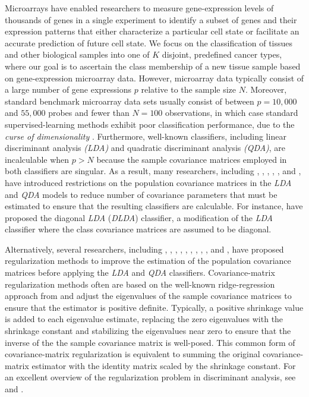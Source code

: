 \documentclass[11pt]{article}
\begin{document}
Microarrays have enabled researchers to measure gene-expression levels of thousands of genes in a single experiment to identify a subset of genes and their expression patterns that either characterize a particular cell state or facilitate an accurate prediction of future cell state.  We focus on the classification of tissues and other biological samples into one of $K$ disjoint, predefined cancer types, where our goal is to ascertain the class membership of a new tissue sample based on gene-expression microarray data. However, microarray data typically consist of a large number of gene expressions $p$ relative to the sample size $N$. Moreover, standard benchmark microarray data sets usually consist of between $p = 10,000$ and $55,000$ probes and fewer than $N = 100$ observations, in which case standard supervised-learning methods exhibit poor classification performance, due to the \emph{curse of dimensionality} \citep{Bellman:1961tn}. Furthermore, well-known classifiers, including linear discriminant analysis \emph{(LDA)} and quadratic discriminant analysis \emph{(QDA)}, are incalculable when $p > N$ because the sample covariance matrices employed in both classifiers are singular. As a result, many researchers, including \cite*{Mai:2012bf}, \cite*{Merchante:2012vk}, \cite{Witten:2011kc}, \cite*{Pang:2009ik}, \cite*{Huang:2010ju}, and \cite*{Clemmensen:2011kr}, have introduced restrictions on the population covariance matrices in the \emph{LDA} and \emph{QDA} models to reduce number of covariance parameters that must be estimated to ensure that the resulting classifiers are calculable.  For instance, \cite{Dudoit:2002ev} have proposed the diagonal \emph{LDA} (\emph{DLDA}) classifier, a modification of the \emph{LDA} classifier where the class covariance matrices are assumed to be diagonal.

Alternatively, several researchers, including \cite*{Zhang:2010va}, \cite{Ye:2009gd}, \cite{Ji:2008wp}, \cite*{Guo:2007te}, \cite{Srivastava:2007ud}, \cite{Ye:2006vx}, \cite*{Thomaz:2006ef}, \cite{Ye:2005uu}, \cite{Mkhadri:1995jp}, and \cite{Peck:1982tt}, have proposed regularization methods to improve the estimation of the population covariance matrices before applying the \emph{LDA} and \emph{QDA} classifiers. Covariance-matrix regularization methods often are based on the well-known ridge-regression approach from \cite{Hoerl:1970cd} and adjust the eigenvalues of the sample covariance matrices to ensure that the estimator is positive definite. Typically, a positive shrinkage value is added to each eigenvalue estimate, replacing the zero eigenvalues with the shrinkage constant and stabilizing the eigenvalues near zero to ensure that the inverse of the the sample covariance matrix is well-posed. This common form of covariance-matrix regularization is equivalent to summing the original covariance-matrix estimator with the identity matrix scaled by the shrinkage constant. For an excellent overview of the regularization problem in discriminant analysis, see \cite{Murphy:2012uq} and \cite{Mkhadri:1997gy}.
\end{document}
